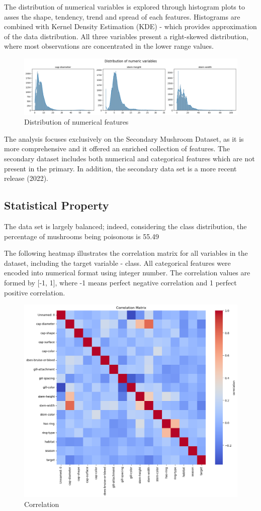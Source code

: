 \documentclass{article}
\begin{document}
The distribution of numerical variables is explored through histogram plots to asses the shape, tendency, trend and spread of each features. 
Histograms are combined with Kernel Density Estimation (KDE) - which provides approximation of the data distribution. All three variables present a right-skewed distribution, where most observations are concentrated in the lower range values.

\begin{figure}[H]
\centering
\includegraphics[width=1\linewidth]{Distribution-Num.png}
\caption{\label{fig:frog}Distribution of numerical features}
\end{figure}

The analysis focuses exclusively on the Secondary Mushroom Dataset, as it is more comprehensive and it offered an enriched collection of features. The secondary dataset includes both numerical and categorical features which are not present in the primary. In addition, the secondary data set is a more recent release (2022).  


\subsection{Statistical Property}

The data set is largely balanced; indeed, considering the class distribution, the percentage of mushrooms being poisonous is 55.49%

The following heatmap illustrates the correlation matrix for all variables in the dataset, including the target variable - class. All categorical features were encoded into numerical format using integer number. The correlation values are formed by [-1, 1], where -1 means perfect negative correlation and 1 perfect positive correlation. 


\begin{figure}[H]
\centering
\includegraphics[width=0.5\linewidth]{Correlation-All.png}
\caption{\label{fig:frog}Correlation}
\end{figure}
\end{document}
